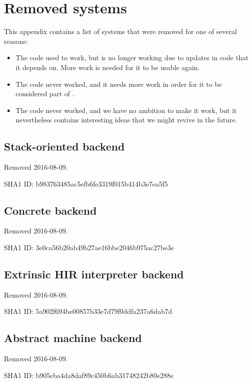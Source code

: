 \chapter{Removed systems}

This appendix contains a list of systems that were removed for one of
several reasons:

\begin{itemize}
\item The code used to work, but is no longer working due to updates
  in code that it depends on.  More work is needed for it to be usable
  again.
\item The code never worked, and it needs more work in order for it to
  be considered part of \sysname{}.
\item The code never worked, and we have no ambition to make it work,
  but it nevertheless contains interesting ideas that we might revive
  in the future.
\end{itemize}

\section{Stack-oriented \clanguage{} backend}

Removed 2016-08-09.

SHA1 ID: b983763485ac5efb6fe3319f015b414b3e7ea5f5

\section{Concrete \commonlisp{} backend}

Removed 2016-08-09.

SHA1 ID: 3e0ca56b20ab49b27ae16bbe2046b975ac27be3e

\section{Extrinsic HIR interpreter backend}

Removed 2016-08-09.

SHA1 ID: 5a902f694be00857b33e7d79f0ddfa237a6dab7d

\section{Abstract machine backend}

Removed 2016-08-09.

SHA1 ID: b905eba4da8daf89c450b6ab31748242b80e288e

